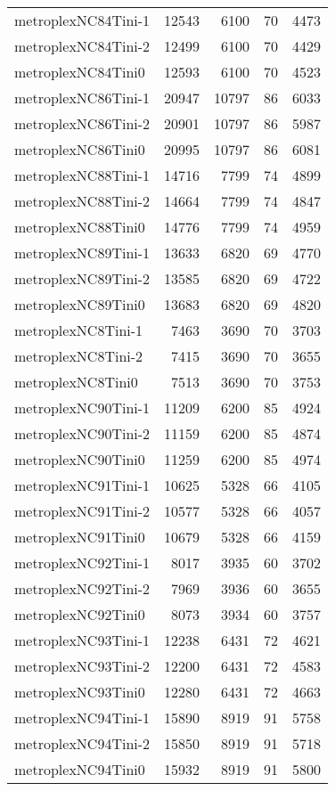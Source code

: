 \begin{longtable}{lrrrr}
metroplexNC84Tini-1 & 12543 & 6100 & 70 & 4473 \\
metroplexNC84Tini-2 & 12499 & 6100 & 70 & 4429 \\
metroplexNC84Tini0 & 12593 & 6100 & 70 & 4523 \\
metroplexNC86Tini-1 & 20947 & 10797 & 86 & 6033 \\
metroplexNC86Tini-2 & 20901 & 10797 & 86 & 5987 \\
metroplexNC86Tini0 & 20995 & 10797 & 86 & 6081 \\
metroplexNC88Tini-1 & 14716 & 7799 & 74 & 4899 \\
metroplexNC88Tini-2 & 14664 & 7799 & 74 & 4847 \\
metroplexNC88Tini0 & 14776 & 7799 & 74 & 4959 \\
metroplexNC89Tini-1 & 13633 & 6820 & 69 & 4770 \\
metroplexNC89Tini-2 & 13585 & 6820 & 69 & 4722 \\
metroplexNC89Tini0 & 13683 & 6820 & 69 & 4820 \\
metroplexNC8Tini-1 & 7463 & 3690 & 70 & 3703 \\
metroplexNC8Tini-2 & 7415 & 3690 & 70 & 3655 \\
metroplexNC8Tini0 & 7513 & 3690 & 70 & 3753 \\
metroplexNC90Tini-1 & 11209 & 6200 & 85 & 4924 \\
metroplexNC90Tini-2 & 11159 & 6200 & 85 & 4874 \\
metroplexNC90Tini0 & 11259 & 6200 & 85 & 4974 \\
metroplexNC91Tini-1 & 10625 & 5328 & 66 & 4105 \\
metroplexNC91Tini-2 & 10577 & 5328 & 66 & 4057 \\
metroplexNC91Tini0 & 10679 & 5328 & 66 & 4159 \\
metroplexNC92Tini-1 & 8017 & 3935 & 60 & 3702 \\
metroplexNC92Tini-2 & 7969 & 3936 & 60 & 3655 \\
metroplexNC92Tini0 & 8073 & 3934 & 60 & 3757 \\
metroplexNC93Tini-1 & 12238 & 6431 & 72 & 4621 \\
metroplexNC93Tini-2 & 12200 & 6431 & 72 & 4583 \\
metroplexNC93Tini0 & 12280 & 6431 & 72 & 4663 \\
metroplexNC94Tini-1 & 15890 & 8919 & 91 & 5758 \\
metroplexNC94Tini-2 & 15850 & 8919 & 91 & 5718 \\
metroplexNC94Tini0 & 15932 & 8919 & 91 & 5800 \\

\end{longtable}
